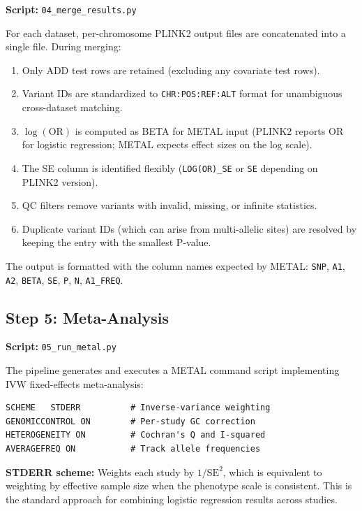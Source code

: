\documentclass[11pt,letterpaper]{article}
\begin{document}
\textbf{Script:} \texttt{04\_merge\_results.py}

For each dataset, per-chromosome PLINK2 output files are concatenated into a single file. During merging:

\begin{enumerate}[nosep]
    \item Only ADD test rows are retained (excluding any covariate test rows).
    \item Variant IDs are standardized to \texttt{CHR:POS:REF:ALT} format for unambiguous cross-dataset matching.
    \item $\log(\text{OR})$ is computed as BETA for METAL input (PLINK2 reports OR for logistic regression; METAL expects effect sizes on the log scale).
    \item The SE column is identified flexibly (\texttt{LOG(OR)\_SE} or \texttt{SE} depending on PLINK2 version).
    \item QC filters remove variants with invalid, missing, or infinite statistics.
    \item Duplicate variant IDs (which can arise from multi-allelic sites) are resolved by keeping the entry with the smallest P-value.
\end{enumerate}

The output is formatted with the column names expected by METAL: \texttt{SNP}, \texttt{A1}, \texttt{A2}, \texttt{BETA}, \texttt{SE}, \texttt{P}, \texttt{N}, \texttt{A1\_FREQ}.

\subsection{Step 5: Meta-Analysis}
\label{sec:step5}

\textbf{Script:} \texttt{05\_run\_metal.py}

The pipeline generates and executes a METAL command script implementing IVW fixed-effects meta-analysis:

\begin{verbatim}
SCHEME   STDERR          # Inverse-variance weighting
GENOMICCONTROL ON        # Per-study GC correction
HETEROGENEITY ON         # Cochran's Q and I-squared
AVERAGEFREQ ON           # Track allele frequencies
\end{verbatim}

\textbf{STDERR scheme:} Weights each study by $1/\text{SE}^2$, which is equivalent to weighting by effective sample size when the phenotype scale is consistent. This is the standard approach for combining logistic regression results across studies.
\end{document}

